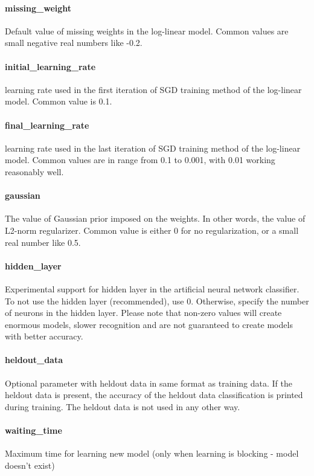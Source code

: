 \paragraph{missing\_weight}
Default value of missing weights in the log-linear model. Common values are small
negative real numbers like -0.2.

\paragraph{initial\_learning\_rate}
learning rate used in the first iteration of SGD training method of the log-linear
model. Common value is 0.1.

\paragraph{final\_learning\_rate}
learning rate used in the last iteration of SGD training method of the log-linear
model. Common values are in range from 0.1 to 0.001, with 0.01 working reasonably well.

\paragraph{gaussian}
The value of Gaussian prior imposed on the weights. In other words, the value of
L2-norm regularizer. Common value is either 0 for no regularization, or a small
real number like 0.5.

\paragraph{hidden\_layer}
Experimental support for hidden layer in the artificial neural network classifier.
To not use the hidden layer (recommended), use 0. Otherwise, specify the number
of neurons in the hidden layer. Please note that non-zero values will create
enormous models, slower recognition and are not guaranteed to create models with
better accuracy.

\paragraph{heldout\_data}
Optional parameter with heldout data in same format as training data. If the heldout data
is present, the accuracy of the heldout data classification is printed during
training. The heldout data is not used in any other way.

\paragraph{waiting\_time}
Maximum time for learning new model (only when learning is blocking - model doesn't exist)


